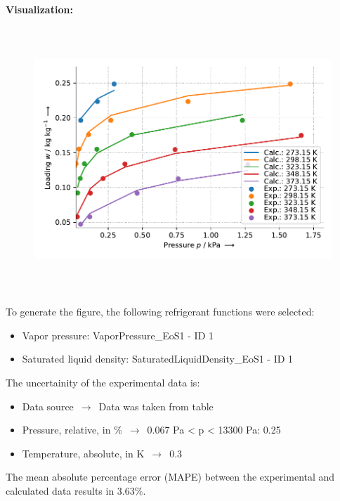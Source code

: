 \textbf{Visualization:}
%
\begin{figure}[!htp]
{\noindent\includegraphics[height=10cm, keepaspectratio]{figs/ads/ads_Water_zeolite_pellet_5A_Toth_1.pdf}}
\end{figure}
%

To generate the figure, the following refrigerant functions were selected:
\begin{itemize}
\item Vapor pressure: VaporPressure\_EoS1 - ID 1
\item Saturated liquid density: SaturatedLiquidDensity\_EoS1 - ID 1
\end{itemize}

The uncertainity of the experimental data is:
\begin{itemize}
\item Data source $\,\to\,$ Data was taken from table
\item Pressure, relative, in \% $\,\to\,$ 0.067 Pa < p < 13300 Pa: 0.25%
\item Temperature, absolute, in $\si{\kelvin}$ $\,\to\,$ 0.3
\end{itemize}

The mean absolute percentage error (MAPE) between the experimental and calculated data results in 3.63\%.
\FloatBarrier
\newpage
